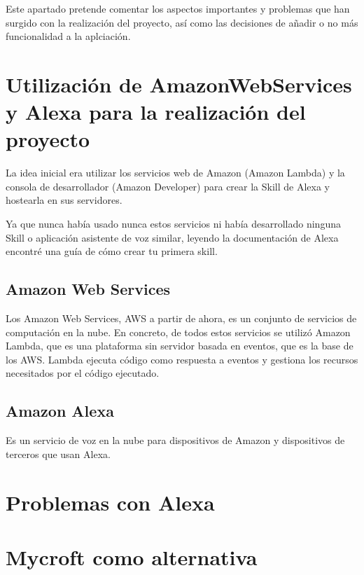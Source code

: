 
Este apartado pretende comentar los aspectos importantes y problemas que han surgido con la realización del proyecto, así como las decisiones de añadir o no más funcionalidad a la aplciación.
\section{Utilización de AmazonWebServices y Alexa para la realización del proyecto}
La idea inicial era utilizar los servicios web de Amazon (Amazon Lambda) y la consola de desarrollador (Amazon Developer) para crear la Skill de Alexa y hostearla en sus servidores.

Ya que nunca había usado nunca estos servicios ni había desarrollado ninguna Skill o aplicación asistente de voz similar, leyendo la documentación de Alexa encontré una guía de cómo crear tu primera skill.
\subsection{Amazon Web Services}
Los Amazon Web Services, AWS a partir de ahora, es un conjunto de servicios de computación en la nube. En concreto, de todos estos servicios se utilizó Amazon Lambda, que es una plataforma sin servidor basada en eventos, que es la base de los AWS. Lambda ejecuta código como respuesta a eventos y gestiona los recursos necesitados por el código ejecutado.
\subsection{Amazon Alexa}
Es un servicio de voz en la nube para dispositivos de Amazon y dispositivos de terceros que usan Alexa.
\section{Problemas con Alexa}
\section{Mycroft como alternativa}